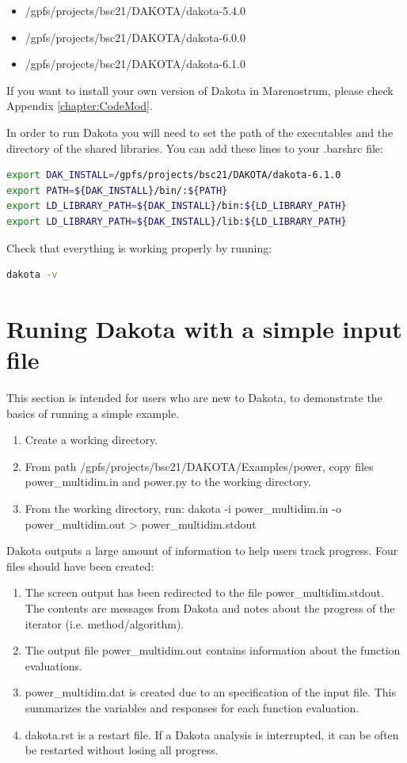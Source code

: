 \documentclass[12pt,a4paper,article]{memoir}
\begin{document}
\begin{itemize}
\item /gpfs/projects/bsc21/DAKOTA/dakota-5.4.0
\item /gpfs/projects/bsc21/DAKOTA/dakota-6.0.0
\item /gpfs/projects/bsc21/DAKOTA/dakota-6.1.0
\end{itemize}

If you want to install your own version of Dakota in Marenostrum, please check Appendix \ref{chapter:CodeMod}.


In order to run Dakota you will need to set the path of the executables and the directory of the shared libraries. You can add these lines to your .barshrc file:

\begin{lstlisting}[style=MyCodeStyle,language=bash]
export DAK_INSTALL=/gpfs/projects/bsc21/DAKOTA/dakota-6.1.0
export PATH=${DAK_INSTALL}/bin/:${PATH}
export LD_LIBRARY_PATH=${DAK_INSTALL}/bin:${LD_LIBRARY_PATH}
export LD_LIBRARY_PATH=${DAK_INSTALL}/lib:${LD_LIBRARY_PATH}
\end{lstlisting}

Check that everything is working properly by running:

\begin{lstlisting}[style=MyCodeStyle,language=bash]
dakota -v
\end{lstlisting}

\section{Runing Dakota with a simple input file}
This section is intended for users who are new to Dakota, to demonstrate the basics of running a simple example.

\begin{enumerate}
\item Create a working directory.
\item From path /gpfs/projects/bsc21/DAKOTA/Examples/power, copy files power\_multidim.in and power.py to the working directory.
\item From the working directory, run: dakota -i power\_multidim.in -o power\_multidim.out \textgreater{} power\_multidim.stdout
\end{enumerate}

Dakota outputs a large amount of information to help users track progress. Four files should have been created:
\begin{enumerate}
\item The screen output has been redirected to the file power\_multidim.stdout. The contents are messages from Dakota and notes about the progress of the iterator (i.e. method/algorithm).
\item The output file power\_multidim.out contains information about the function evaluations.
\item power\_multidim.dat is created due to an specification of the input file. This summarizes the variables and responses for each function evaluation.
\item dakota.rst is a restart file. If a Dakota analysis is interrupted, it can be often be restarted without losing all progress.
\end{enumerate}
\end{document}
